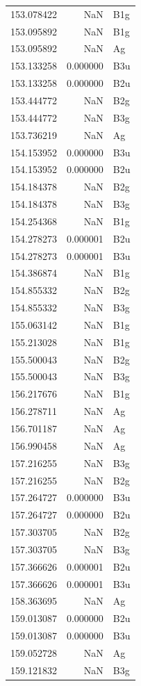\begin{longtable}{rrl}
153.078422 & NaN & B1g \\
153.095892 & NaN & B1g \\
153.095892 & NaN & Ag \\
153.133258 & 0.000000 & B3u \\
153.133258 & 0.000000 & B2u \\
153.444772 & NaN & B2g \\
153.444772 & NaN & B3g \\
153.736219 & NaN & Ag \\
154.153952 & 0.000000 & B3u \\
154.153952 & 0.000000 & B2u \\
154.184378 & NaN & B2g \\
154.184378 & NaN & B3g \\
154.254368 & NaN & B1g \\
154.278273 & 0.000001 & B2u \\
154.278273 & 0.000001 & B3u \\
154.386874 & NaN & B1g \\
154.855332 & NaN & B2g \\
154.855332 & NaN & B3g \\
155.063142 & NaN & B1g \\
155.213028 & NaN & B1g \\
155.500043 & NaN & B2g \\
155.500043 & NaN & B3g \\
156.217676 & NaN & B1g \\
156.278711 & NaN & Ag \\
156.701187 & NaN & Ag \\
156.990458 & NaN & Ag \\
157.216255 & NaN & B3g \\
157.216255 & NaN & B2g \\
157.264727 & 0.000000 & B3u \\
157.264727 & 0.000000 & B2u \\
157.303705 & NaN & B2g \\
157.303705 & NaN & B3g \\
157.366626 & 0.000001 & B2u \\
157.366626 & 0.000001 & B3u \\
158.363695 & NaN & Ag \\
159.013087 & 0.000000 & B2u \\
159.013087 & 0.000000 & B3u \\
159.052728 & NaN & Ag \\
159.121832 & NaN & B3g \\

\end{longtable}
